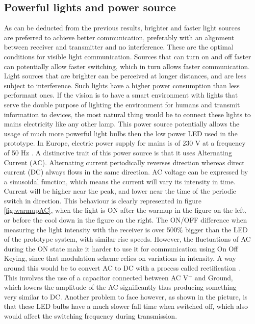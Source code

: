 \subsection{Powerful lights and power source}
\label{acphy}
As can be deducted from the previous results, brighter and faster light sources are preferred to achieve better communication, preferably with an alignment between receiver and transmitter and no interference.
These are the optimal conditions for visible light communication. 
Sources that can turn on and off faster can potentially allow faster switching, which in turn allows faster communication.
Light sources that are brighter can be perceived at longer distances, and are less subject to interference.
Such lights have a higher power consumption than less performant ones.
If the vision is to have a smart environment with lights that serve the double purpose of lighting the environment for humans and transmit information to devices, the most natural thing would be to connect these lights to mains electricity like any other lamp.
This power source potentially allows the usage of much more powerful light bulbs then the low power LED used in the prototype.
In Europe, electric power supply for mains is of 230 V at a frequency of 50 Hz .
A distinctive trait of this power source is that it uses Alternating Current (AC).
Alternating current periodically reverses direction whereas direct current (DC) always flows in the same direction.
AC voltage can be expressed by a sinusoidal function, which means the current will vary its intensity in time.
Current will be higher near the peak, and lower near the time of the periodic switch in direction. 
This behaviour is clearly represented in figure \ref{fig:warmupAC}, when the light is ON after the warmup in the figure on the left, or before the cool down in the figure on the right.
The ON/OFF difference when measuring the light intensity with the receiver is over 500\% bigger than the LED of the prototype system, with similar rise speeds.
However, the fluctuations of AC during the ON state make it harder to use it for communication using On Off Keying, since that modulation scheme relies on variations in intensity.
A way around this would be to convert AC to DC with a process called rectification .
This involves the use of a capacitor connected between AC V$^{+}$ and Ground,  which lowers the amplitude of the AC significantly thus producing something very similar to DC.
Another problem to face however, as shown in the picture, is that these LED bulbs have a much slower fall time when switched off, which also would affect the switching frequency during transmission.

